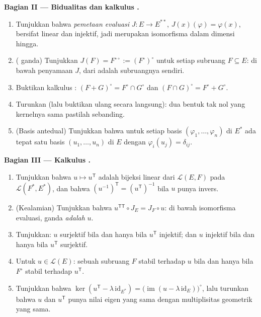 \begin{problem}
\medskip
\noindent\textbf{Bagian II --- Bidualitas dan kalkulus
.}
\begin{enumerate}[resume]
  \item Tunjukkan bahwa \emph{pemetaan evaluasi} $J \colon E \to
        E^{**}$, $J(x)(\varphi) = \varphi(x)$, bersifat linear dan
        injektif, jadi merupakan isomorfisma dalam dimensi hingga.
  \item ( ganda) Tunjukkan $J(F) = F^{\circ\circ} :=
        (F^\circ)^\circ$ untuk setiap subruang $F \subseteq E$: di
        bawah penyamaan $J$,  dari 
        adalah subruangnya sendiri.
  \item Buktikan kalkulus : $(F + G)^\circ = F^\circ
        \cap G^\circ$ dan $(F \cap G)^\circ = F^\circ + G^\circ$.
  \item Turunkan (lalu buktikan ulang secara langsung): dua bentuk tak
        nol yang kernelnya sama pastilah sebanding.
  \item (Basis antedual) Tunjukkan bahwa untuk setiap basis $(\varphi_1,
        \dots, \varphi_n)$ di $E^*$ ada tepat satu basis
        $(u_1, \dots, u_n)$ di $E$ dengan $\varphi_i(u_j) =
        \delta_{ij}$.
\end{enumerate}

\medskip
\noindent\textbf{Bagian III --- Kalkulus .}
\begin{enumerate}[resume]
  \item Tunjukkan bahwa $u \mapsto u^{\mathsf T}$ adalah bijeksi linear
        dari $\mathcal{L}(E, F)$ pada $\mathcal{L}(F^*, E^*)$,
        dan bahwa $(u^{-1})^{\mathsf T} = (u^{\mathsf T})^{-1}$
        bila $u$ punya invers.
  \item (Kealamian) Tunjukkan bahwa $u^{\mathsf T\mathsf T} \circ J_E
        = J_F \circ u$: di bawah isomorfisma evaluasi,
         ganda \emph{adalah} $u$.
  \item Tunjukkan: $u$ surjektif bila dan hanya bila $u^{\mathsf T}$
        injektif; dan $u$ injektif bila dan hanya bila $u^{\mathsf T}$
        surjektif.
  \item Untuk $u \in \mathcal{L}(E)$: sebuah subruang $F$ stabil
        terhadap $u$ bila dan hanya bila $F^\circ$ stabil terhadap
        $u^{\mathsf T}$.
  \item Tunjukkan bahwa $\ker(u^{\mathsf T} - \lambda\,
        \mathrm{id}_{E^*}) = \bigl(\operatorname{im}(u - \lambda\,
        \mathrm{id}_E)\bigr)^\circ$, lalu turunkan bahwa $u$ dan
        $u^{\mathsf T}$ punya nilai eigen yang sama dengan
        multiplisitas geometrik yang sama.
\end{enumerate}


\end{problem}
